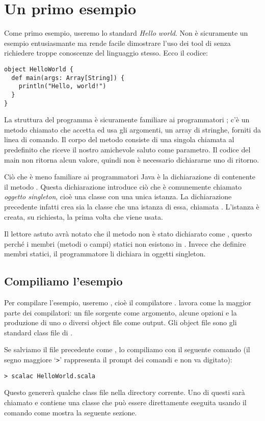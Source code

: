 \section{Un primo esempio}
\label{sec:first-example}

Come primo esempio, useremo lo standard \emph{Hello world}. Non \`e sicuramente un esempio entusiasmante ma rende facile dimostrare l'uso dei tool di \Scala senza richiedere troppe conoscenze del linguaggio stesso. 
Ecco il codice:
\begin{lstlisting}
object HelloWorld {
  def main(args: Array[String]) {
    println("Hello, world!")
  }
}
\end{lstlisting}
La struttura del programma \`e sicuramente familiare ai programmatori \Java; 
c'\`e un metodo chiamato  che accetta ed usa gli argomenti, un array di stringhe, forniti da linea di comando. Il corpo del metodo consiste di una singola chiamata al predefinito  che riceve il nostro amichevole saluto come parametro. Il codice del main non ritorna alcun valore, quindi non \`e necessario dichiararne uno di ritorno.

Ci\`o che \`e meno familiare ai programmatori Java \`e la dichiarazione di  contenente il metodo . Questa dichiarazione introduce ci\`o che \`e comunemente chiamato \emph{oggetto singleton}, cio\`e una classe con una unica istanza. La dichiarazione precedente infatti crea sia la classe  che una istanza di essa, chiamata . L'istanza \`e creata, su richiesta, la prima volta che viene usata.

Il lettore astuto avr\`a notato che il metodo  non \`e stato dichiarato come , questo perch\'e  i membri (metodi o campi) statici non esistono in \Scala. Invece che definire membri statici, il programmatore \Scala li dichiara in oggetti singleton.

\subsection{Compiliamo l'esempio}
\label{sec:compiling-example}

Per compilare l'esempio, useremo \scalac, cio\`e il compilatore \Scala. \scalac lavora come la maggior parte dei compilatori: un file sorgente come argomento, alcune opzioni e la produzione di uno o diversi object file come output. Gli object file sono gli standard class file di \Java.

Se salviamo il file precedente come , lo compiliamo con il seguente comando (il segno maggiore `\verb|>|' rappresenta il prompt dei comandi e non va digitato):
\begin{verbatim}
> scalac HelloWorld.scala
\end{verbatim}
Questo generer\`a  qualche class file nella directory corrente. Uno di questi sar\`a  chiamato  e contiene  una classe che pu\`o essere direttamente eseguita usando il comando \scala come mostra la seguente sezione.

